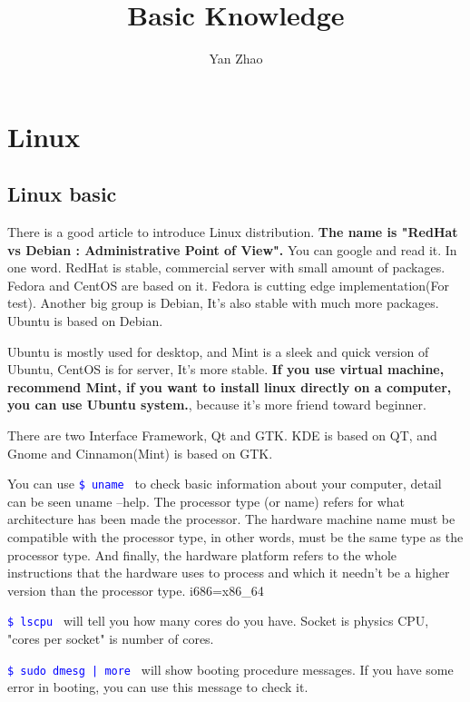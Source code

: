\documentclass[paper=8.5in:11in, twoside, 12pt, pagesize=pdftex]{book}
\newcommand{\linuxcommand}[1]{\texttt{\textcolor{blue}{\$ #1 \Pisymbol{psy}{191}}}}
\begin{document}
\title{Basic Knowledge}
\author{Yan Zhao}
\date{}\maketitle

\tableofcontents

\setcounter{page}{1}

\chapter{Linux}

\section{Linux basic}
There is a good article to introduce Linux distribution. \textbf{The name is "RedHat vs Debian : Administrative Point of View".} You can google and read it. In one word. RedHat is stable, commercial server with small amount of packages. Fedora and CentOS are based on it. Fedora is cutting edge implementation(For test). Another big group is Debian, It's also stable with much more packages. Ubuntu is based on Debian.

Ubuntu is mostly used for desktop, and Mint is a sleek and quick version of Ubuntu, CentOS is for server, It's more stable. \textbf{If you use virtual machine, recommend Mint, if you want to install linux directly on a computer, you can use Ubuntu system.}, because it's more friend toward beginner. 

There are two Interface Framework, Qt and GTK.  KDE is based on QT, and Gnome and Cinnamon(Mint) is based on GTK.  

You can use \linuxcommand{uname} to check basic information about your computer, detail can be seen uname --help. The processor type (or name) refers for what architecture has been made the processor.  The hardware machine name must be compatible with the processor type, in other words, must be the same type as the processor type.  And finally, the hardware platform refers to the whole instructions that the hardware uses to process and which it needn't be a higher version than the processor type. i686=x86\_64

\linuxcommand{lscpu} will tell you how many cores do you have. Socket is physics CPU, "cores per socket" is number of cores. 

\linuxcommand{sudo dmesg | more} will show booting procedure messages. If you have some error in booting, you can use this message to check it. 
 
\end{document}

